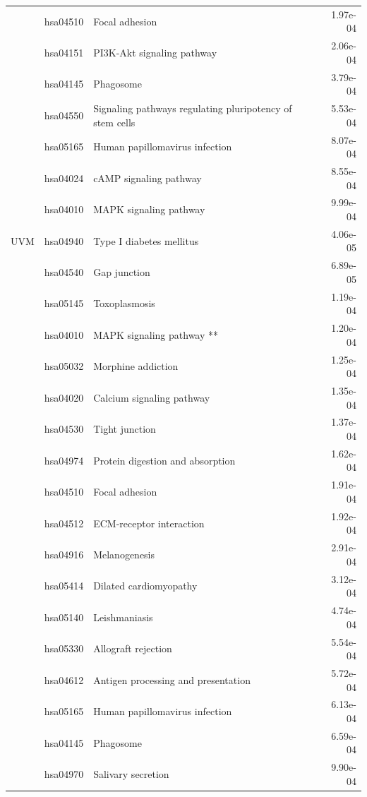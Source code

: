\begin{longtable}{cllr}
 \rowcolor{\clrmatch}& hsa04510 & Focal adhesion & 1.97e-04 \\ 
 & hsa04151 & \textcolor{\clrnew}{PI3K-Akt signaling pathway} & 2.06e-04 \\ 
 & hsa04145 & \textcolor{\clrnew}{Phagosome} & 3.79e-04 \\ 
 & hsa04550 & \textcolor{\clrnew}{Signaling pathways regulating pluripotency of stem cells} & 5.53e-04 \\ 
 & hsa05165 & \textcolor{\clrnew}{Human papillomavirus infection} & 8.07e-04 \\ 
 & hsa04024 & \textcolor{\clrnew}{cAMP signaling pathway} & 8.55e-04 \\ 
 & hsa04010 & \textcolor{\clrnew}{MAPK signaling pathway} & 9.99e-04 \\ 
\midrule 
UVM & hsa04940 & \textcolor{\clrnew}{Type I diabetes mellitus} & 4.06e-05\\ 
 & hsa04540 & \textcolor{\clrnew}{Gap junction} & 6.89e-05 \\ 
 & hsa05145 & \textcolor{\clrnew}{Toxoplasmosis} & 1.19e-04 \\ 
 \rowcolor{\clrpath}& hsa04010 & MAPK signaling pathway ** & 1.20e-04 \\ 
 & hsa05032 & \textcolor{\clrnew}{Morphine addiction} & 1.25e-04 \\ 
 & hsa04020 & \textcolor{\clrnew}{Calcium signaling pathway} & 1.35e-04 \\ 
 & hsa04530 & \textcolor{\clrnew}{Tight junction} & 1.37e-04 \\ 
 & hsa04974 & \textcolor{\clrnew}{Protein digestion and absorption} & 1.62e-04 \\ 
 & hsa04510 & \textcolor{\clrnew}{Focal adhesion} & 1.91e-04 \\ 
 & hsa04512 & \textcolor{\clrnew}{ECM-receptor interaction} & 1.92e-04 \\ 
 & hsa04916 & \textcolor{\clrnew}{Melanogenesis} & 2.91e-04 \\ 
 & hsa05414 & \textcolor{\clrnew}{Dilated cardiomyopathy} & 3.12e-04 \\ 
 & hsa05140 & \textcolor{\clrnew}{Leishmaniasis} & 4.74e-04 \\ 
 & hsa05330 & \textcolor{\clrnew}{Allograft rejection} & 5.54e-04 \\ 
 & hsa04612 & \textcolor{\clrnew}{Antigen processing and presentation} & 5.72e-04 \\ 
 & hsa05165 & \textcolor{\clrnew}{Human papillomavirus infection} & 6.13e-04 \\ 
 & hsa04145 & \textcolor{\clrnew}{Phagosome} & 6.59e-04 \\ 
 & hsa04970 & \textcolor{\clrnew}{Salivary secretion} & 9.90e-04 \\ 
\midrule 
\end{longtable} 

